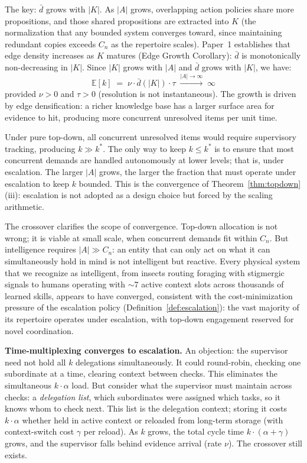 \documentclass[11pt]{article}
\theoremstyle{definition}
\begin{document}
The key: $\bar{d}$ grows with $|K|$. As $|A|$ grows, overlapping
action policies share more propositions, and those shared propositions
are extracted into $K$ (the normalization that any bounded system
converges toward, since maintaining redundant copies exceeds $C_n$ as
the repertoire scales). Paper~1 \cite{McCarthy2026a} establishes that
edge density increases as $K$ matures (Edge Growth Corollary): $\bar{d}$ is
monotonically non-decreasing in $|K|$. Since $|K|$ grows with $|A|$
and $\bar{d}$ grows with $|K|$, we have:
\[
\mathbb{E}[k] \;=\; \nu \cdot \bar{d}(|K|) \cdot \tau
\;\xrightarrow{|A| \to \infty}\; \infty
\]
provided $\nu > 0$ and $\tau > 0$ (resolution is not instantaneous).
The growth is driven by edge densification: a richer knowledge base has
a larger surface area for evidence to hit, producing more concurrent
unresolved items per unit time.

Under pure top-down, all concurrent unresolved items would require
supervisory tracking, producing $k \gg k^*$. The only way to keep
$k \leq k^*$ is to ensure that most concurrent demands are handled
autonomously at lower levels; that is, under escalation. The larger
$|A|$ grows, the larger the fraction that must operate under
escalation to keep $k$ bounded. This is the convergence of
Theorem~\ref{thm:topdown}(iii): escalation is not adopted as a
design choice but forced by the scaling arithmetic.

The crossover clarifies the scope of convergence. Top-down allocation
is not wrong; it is viable at small scale, when concurrent demands fit
within $C_n$. But intelligence requires $|A| \gg C_n$: an entity that
can only act on what it can simultaneously hold in mind is not
intelligent but reactive. Every physical system that we recognize as
intelligent, from insects routing foraging with stigmergic signals to
humans operating with ${\sim}7$ active context slots across thousands of
learned skills, appears to have converged, consistent with the
cost-minimization pressure of the escalation policy
(Definition~\ref{def:escalation}):
the vast majority of its repertoire operates under escalation, with
top-down engagement reserved for novel coordination.

\textbf{Time-multiplexing converges to escalation.}
An objection: the supervisor need not hold all $k$ delegations
simultaneously. It could round-robin, checking one subordinate at a
time, clearing context between checks. This eliminates the simultaneous
$k \cdot \alpha$ load. But consider what the supervisor must maintain
across checks: a \emph{delegation list}, which subordinates were
assigned which tasks, so it knows whom to check next. This list is the
delegation context; storing it costs $k \cdot \alpha$ whether held in
active context or reloaded from long-term storage (with context-switch
cost $\gamma$ per reload). As $k$ grows, the total cycle time $k \cdot
(\alpha + \gamma)$ grows, and the supervisor falls behind evidence
arrival (rate $\nu$). The crossover still exists.
\end{document}
